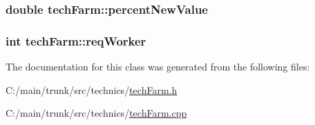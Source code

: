 \label{classtech_farm_abd1992a08582622f44ca7ed8fd9072d0}
\hypertarget{classtech_farm_a0baa87da42934d1351ff609caab75d1b}{
\subsubsection[{percentNewValue}]{\setlength{\rightskip}{0pt plus 5cm}double {\bf techFarm::percentNewValue}}}
\label{classtech_farm_a0baa87da42934d1351ff609caab75d1b}
\hypertarget{classtech_farm_a3f395d50454e34c3f495fdc53a8ef194}{
\subsubsection[{reqWorker}]{\setlength{\rightskip}{0pt plus 5cm}int {\bf techFarm::reqWorker}}}
\label{classtech_farm_a3f395d50454e34c3f495fdc53a8ef194}


The documentation for this class was generated from the following files:\begin{DoxyCompactItemize}
\item 
C:/main/trunk/src/technics/\hyperlink{tech_farm_8h}{techFarm.h}\item 
C:/main/trunk/src/technics/\hyperlink{tech_farm_8cpp}{techFarm.cpp}\end{DoxyCompactItemize}
